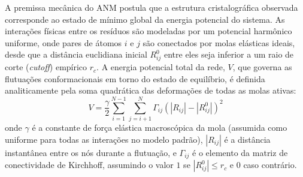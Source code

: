 \documentclass[12pt, a4paper]{article}
\theoremstyle{plain}
\theoremstyle{definition}
\theoremstyle{remark}
\newcommand{\ident}{\hspace{2em}}
\begin{document}
\ident A premissa mecânica do ANM postula que a estrutura cristalográfica observada corresponde ao estado de mínimo global da energia potencial do sistema. As interações físicas entre os resíduos são modeladas por um potencial harmônico uniforme, onde pares de átomos $i$ e $j$ são conectados por molas elásticas ideais, desde que a distância euclidiana inicial $R_{ij}^0$ entre eles seja inferior a um raio de corte (\textit{cutoff}) empírico $r_c$. A energia potencial total da rede, $V$, que governa as flutuações conformacionais em torno do estado de equilíbrio, é definida analiticamente pela soma quadrática das deformações de todas as molas ativas:
\begin{equation*}
    V = \frac{\gamma}{2} \sum_{i=1}^{N-1} \sum_{j=i+1}^{N} \Gamma_{ij} \left( |R_{ij}| - |R_{ij}^0| \right)^2 \label{eq:anm_potential}
\end{equation*}
onde $\gamma$ é a constante de força elástica macroscópica da mola (assumida como uniforme para todas as interações no modelo padrão), $|R_{ij}|$ é a distância instantânea entre os nós durante a flutuação, e $\Gamma_{ij}$ é o elemento da matriz de conectividade de Kirchhoff, assumindo o valor $1$ se $|R_{ij}^0| \leq r_c$ e $0$ caso contrário.
\end{document}
